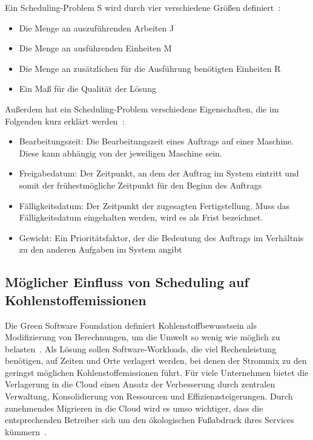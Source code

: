 Ein Scheduling-Problem S wird durch vier verschiedene Größen definiert~\cite{Gawiejnowicz.2020}:
\begin{itemize}
 \item Die Menge an auszuführenden Arbeiten J
 \item Die Menge an ausführenden Einheiten M
 \item Die Menge an zusätzlichen für die Ausführung benötigten Einheiten R
 \item Ein Maß für die Qualität der Lösung %
\end {itemize}
Außerdem hat ein Scheduling-Problem verschiedene Eigenschaften, die im Folgenden kurz erklärt werden~\cite{Pinedo.2022}:
\begin{itemize}
 \item Bearbeitungszeit: Die Bearbeitungszeit eines Auftrags auf einer Maschine. Diese kann abhängig von der jeweiligen Maschine sein.
 \item Freigabedatum: Der Zeitpunkt, an dem der Auftrag im System eintritt und somit der frühestmögliche Zeitpunkt für den Beginn des Auftrags
 \item Fälligkeitsdatum: Der Zeitpunkt der zugesagten Fertigstellung. Muss das Fälligkeitsdatum eingehalten werden, wird es als Frist bezeichnet.
 \item Gewicht: Ein Prioritätsfaktor, der die Bedeutung des Auftrags im Verhältnis zu den anderen Aufgaben im System angibt
\end{itemize}

\subsection{Möglicher Einfluss von Scheduling auf Kohlenstoffemissionen}
Die Green Software Foundation definiert Kohlenstoffbewusstsein als Modifizierung von Berechnungen, um die Umwelt so wenig wie möglich zu belasten~\cite{GreenSoftwareFoundation.2022}.
Als Lösung sollen Software-Workloads, die viel Rechenleistung benötigen, auf Zeiten und Orte verlagert werden, bei denen der Strommix zu den geringst möglichen Kohlenstoffemissionen führt.
Für viele Unternehmen bietet die Verlagerung in die Cloud einen Ansatz der Verbesserung durch zentralen Verwaltung, Konsolidierung von Ressourcen und Effizienzsteigerungen.
Durch zunehmendes Migrieren in die Cloud wird es umso wichtiger, dass die entsprechenden Betreiber sich um den ökologischen Fußabdruck ihres Services kümmern~\cite{Buchanan.2023}.

